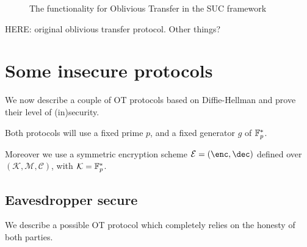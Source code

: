 \begin{figure}
    \begin{center}
    \end{center}
    \caption{The functionality for Oblivious Transfer in the SUC framework}
    \label{func_ot_base}
\end{figure}

HERE: original oblivious transfer protocol. Other things?


\section{Some insecure protocols}

We now describe a couple of OT protocols based on Diffie-Hellman and prove their level of (in)security.

Both protocols will use a fixed prime $p$, and a fixed generator $g$ of $\mathbb{F}_p^\ast$.

Moreover we use a symmetric encryption scheme $\mathcal{E}=(\enc, \dec)$ defined over $(\mathcal{K, M, C})$, with $\mathcal{K}=\mathbb{F}_p^\ast$.

\subsection{Eavesdropper secure}
We describe a possible OT protocol which completely relies on the honesty of both parties.

